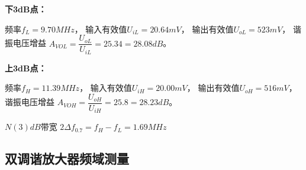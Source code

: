 \documentclass[UTF8]{ctexart}
\begin{document}
\begin{enumerate}[(1)]
    \vspace{-2em}
    \textbf{下3dB点：}

    频率$f_L=9.70MHz$，
    输入有效值$U_{iL}=20.64mV$，
    输出有效值$U_{oL}=523mV$，
    谐振电压增益 $A_{VOL}=\dfrac{U_{oL}}{U_{iL}}=25.34=28.08dB$。

    \textbf{上3dB点：}

    频率$f_H=11.39MHz$，
    输入有效值$U_{iH}=20.00mV$，
    输出有效值$U_{oH}=516mV$，
    谐振电压增益 $A_{VOH}=\dfrac{U_{oH}}{U_{iH}}=25.8=28.23dB$。

    $N(3)dB$带宽 $2\Delta f_{0.7}=f_H-f_L=1.69MHz$

\end{enumerate}

\subsection{双调谐放大器频域测量}
\end{document}
